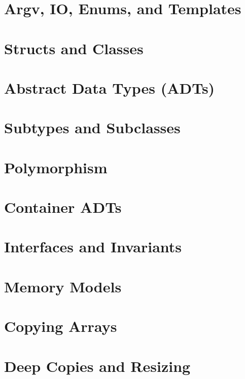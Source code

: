 \documentclass[english, 11pt]{article}
\begin{document}
\section{Argv, IO, Enums, and Templates}
	

\section{Structs and Classes}
	

\section{Abstract Data Types (ADTs)}
	

\section{Subtypes and Subclasses}
	

\section{Polymorphism}
	

\section{Container ADTs}
	

\section{Interfaces and Invariants}
	

\section{Memory Models}
	

\section{Copying Arrays}
	

\section{Deep Copies and Resizing}
	
\end{document}
